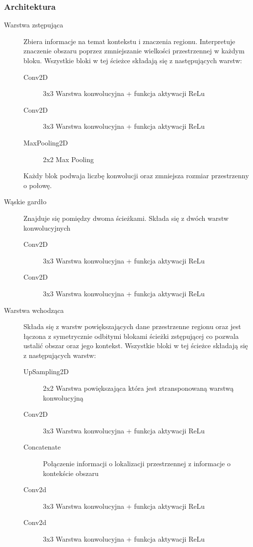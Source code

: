 \documentclass[a4paper,11pt,twoside]{report}
\theoremstyle{definition}
\begin{document}
\subsubsection{Architektura}
\begin{description}
	\item [Warstwa zstępująca] Zbiera informacje na temat kontekstu i znaczenia regionu. Interpretuje znaczenie obszaru poprzez zmniejszanie wielkości przestrzennej w każdym bloku. Wszystkie bloki w tej ścieżce składają się z następujących warstw:
	\begin{description}
		\item [Conv2D] 3x3 Warstwa konwolucyjna + funkcja aktywacji ReLu
		\item [Conv2D] 3x3 Warstwa konwolucyjna + funkcja aktywacji ReLu
		\item [MaxPooling2D]2x2 Max Pooling
	\end{description}
   Każdy blok podwaja liczbę konwolucji oraz zmniejsza rozmiar przestrzenny o  połowę.
	
	\item [Wąskie gardło] Znajduje się pomiędzy dwoma ścieżkami. Składa się z dwóch warstw konwolucyjnych
		\begin{description}
		\item [Conv2D] 3x3 Warstwa konwolucyjna + funkcja aktywacji ReLu
		\item [Conv2D] 3x3 Warstwa konwolucyjna + funkcja aktywacji ReLu
		\end{description}
	
	\item [Warstwa wchodząca] Składa się z warstw powiększających dane przestrzenne regionu oraz jest łączona z symetrycznie odbitymi blokami ścieżki zstępującej co pozwala ustalić obszar oraz jego kontekst. Wszystkie bloki w tej ścieżce składają się z następujących warstw:
	\begin{description}
		\item [UpSampling2D] 2x2 Warstwa powiększająca która jest ztransponowaną warstwą konwolucyjną
		\item [Conv2D] 3x3 Warstwa konwolucyjna + funkcja aktywacji ReLu
		\item [Concatenate] Połączenie informacji o lokalizacji przestrzennej z informacje o kontekście obszaru
		\item [Conv2d] 3x3 Warstwa konwolucyjna + funkcja aktywacji ReLu
		\item [Conv2d] 3x3 Warstwa konwolucyjna + funkcja aktywacji ReLu
		
	\end{description}

\end{description} 
\end{document}
